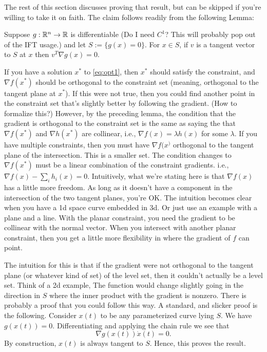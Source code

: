 The rest of this section discusses proving that result, but can be skipped if you're willing to take it on faith. The claim follows readily from the following Lemma:
\begin{lemma}
Suppose $g: \mathbb{R}^n\to \mathbb{R}$ is differentiable (Do I need $C^1$? This will probably pop out of the IFT usage.) and let $S := \{g(x) = 0\}$. For $x\in S$, if $v$ is a tangent vector to $S$ at $x$ then $v^T \nabla g(x) = 0$. 
\end{lemma}
If you have a solution $x^*$ to \eqref{eq:opt1}, then $x^*$ should satisfy the constraint, and $\nabla f(x^*)$ should be orthogonal to the constraint set (meaning, orthogonal to the tangent plane at $x^*$). If this were not true, then you could find another point in the constraint set that's slightly better by following the gradient. (How to formalize this?) However, by the preceding lemma, the condition that the gradient is orthogonal to the constraint set is the same as saying the that $\nabla f(x^*)$ and $\nabla h(x^*)$ are collinear, i.e., $\nabla f(x) = \lambda h(x)$ for some $\lambda$. If you have multiple constraints, then you must have $\nabla f(x^)$ orthogonal to the tangent plane of the intersection. This is a smaller set. The condition changes to $\nabla f(x^*)$ must be a linear combination of the constraint gradients. i.e., $\nabla f(x) - \sum_i h_i(x) = 0$. Intuitively, what we're stating here is that $\nabla f(x)$ has a little more freedom. As long as it doesn't have a component in the intersection of the two tangent planes, you're OK. The intuition becomes clear when you have a 1d space curve embedded in 3d. Or just use an example with a plane and a line. With the planar constraint, you need the gradient to be collinear with the normal vector. When you intersect with another planar constraint, then you get a little more flexibility in where the gradient of $f$ can point. 

The intuition for this is that if the gradient were not orthogonal to the tangent plane (or whatever kind of set) of the level set, then it couldn't actually be a level set. Think of a 2d example, The function would change slightly going in the direction in $S$ where the inner product with the gradient is nonzero. There is probably a proof that you could follow this way. A standard, and slicker proof is the following. Consider $x(t)$ to be any parameterized curve lying $S$. We have $g(x(t)) = 0$. Differentiating and applying the chain rule we see that 
$$
\nabla g(x(t)) \dot x(t) = 0.
$$ 
By construction, $x(t)$ is always tangent to $S$. Hence, this proves the result. 

